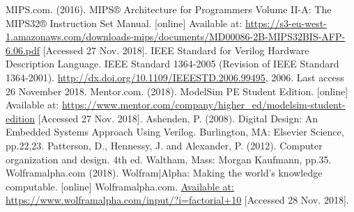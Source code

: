 \documentclass[conference]{IEEEtran}
\begin{document}
\begin{thebibliography}{00}
 MIPS.com. (2016). MIPS® Architecture for Programmers Volume II-A: The MIPS32® Instruction Set Manual. [online] Available at: \url{https://s3-eu-west-1.amazonaws.com/downloads-mips/documents/MD00086-2B-MIPS32BIS-AFP-6.06.pdf} [Accessed 27 Nov. 2018].
 IEEE Standard for Verilog Hardware Description Language. IEEE Standard 1364-2005 (Revision of IEEE Standard 1364-2001). \url{http://dx.doi.org/10.1109/IEEESTD.2006.99495}, 2006. Last access 26 November 2018.
 Mentor.com. (2018). ModelSim PE Student Edition. [online] Available at: \url{https://www.mentor.com/company/higher_ed/modelsim-student-edition} [Accessed 27 Nov. 2018].
 Ashenden, P. (2008). Digital Design: An Embedded Systems Approach Using Verilog. Burlington, MA: Elsevier Science, pp.22,23.
 Patterson, D., Hennessy, J. and Alexander, P. (2012). Computer organization and design. 4th ed. Waltham, Mass: Morgan Kaufmann, pp.35.
 Wolframalpha.com (2018). Wolfram|Alpha: Making the world’s knowledge computable. [online] Wolframalpha.com. \url{Available at: https://www.wolframalpha.com/input/?i=factorial+10} [Accessed 28 Nov. 2018].
\end{thebibliography}
\vspace{12pt}
\end{document}
